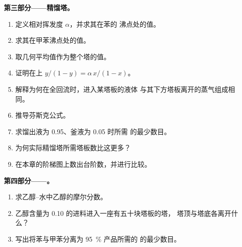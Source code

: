 \begin{problem}
\medskip
\noindent\textbf{第三部分——精馏塔。}
\begin{enumerate}[resume]
  \item 定义相对挥发度 $\alpha$，并求其在苯的
        沸点处的值。
  \item 求其在甲苯沸点处的值。
  \item 取几何平均值作为整个塔的值。
  \item 证明在上 $y/(1 - y) = \alpha\,x/(1 - x)$。
  \item 解释为何在全回流时，进入某塔板的液体
        与其下方塔板离开的蒸气组成相同。
  \item 推导芬斯克公式。
  \item 求馏出液为 0.95、釜液为 0.05 时所需
        的最少数目。
  \item 为何实际精馏塔所需塔板数比这更多？
  \item 在本章的阶梯图上数出台阶数，并进行比较。
\end{enumerate}

\medskip
\noindent\textbf{第四部分——。}
\begin{enumerate}[resume]
  \item 求乙醇–水中乙醇的摩尔分数。
  \item 乙醇含量为 0.10 的进料进入一座有五十块塔板的塔，
        塔顶与塔底各离开什么？
  \item 写出将苯与甲苯分离为 95~\% 产品所需的
        的最少数目。
\end{enumerate}
\end{problem}
